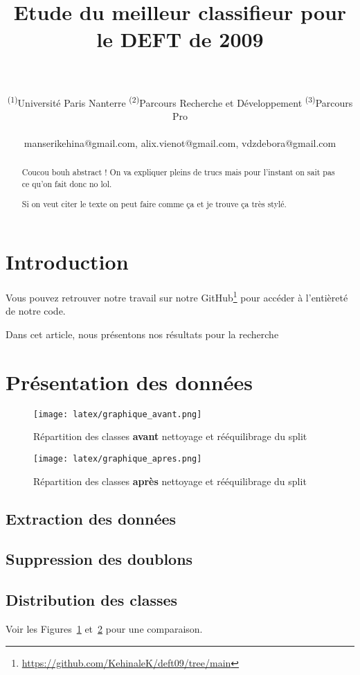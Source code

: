 \documentclass[11pt]{article}
\title{Etude du meilleur classifieur pour le DEFT de 2009}
\author{
  \text{MANSERI Kéhina\textsuperscript{(1)(2)}}
  \text{SIRVEN-VIENOT Alix\textsuperscript{(1)(2)}}
  \text{VAN-DEN-ZANDE Débora\textsuperscript{(1)(3)}}
\\
\\
  \textsuperscript{(1)}Université Paris Nanterre
  \textsuperscript{(2)}Parcours Recherche et Développement
  \textsuperscript{(3)}Parcours Pro
\\
\\
    \small {
    manserikehina@gmail.com, alix.vienot@gmail.com, vdzdebora@gmail.com
    }
\\
}
\begin{document}
\maketitle
\begin{abstract}
Coucou bouh abstract ! On va expliquer pleins de trucs mais pour l'instant on sait pas ce qu'on fait donc no lol.

Si on veut citer le texte on peut faire comme ça \cite{forest2009variation} et je trouve ça très stylé.

\end{abstract}

\section{Introduction}
Vous pouvez retrouver notre travail sur notre GitHub\footnote{\url{https://github.com/KehinaleK/deft09/tree/main}} pour accéder à l'entièreté de notre code.

Dans cet article, nous présentons nos résultats pour la recherche 

\section{Présentation des données}

\begin{figure}[h]
  \texttt{[image: latex/graphique\_avant.png]}
  \caption{Répartition des classes \textbf{avant} nettoyage et rééquilibrage du split}
  \label{fig:graph_avant} %
\end{figure}

\begin{figure}[h]
  \texttt{[image: latex/graphique\_apres.png]}
  \caption{Répartition des classes \textbf{après} nettoyage et rééquilibrage du split}
  \label{fig:graph_apres} %
\end{figure}

\subsection{Extraction des données}

\subsection{Suppression des doublons}

\subsection{Distribution des classes}
Voir les Figures~\ref{fig:graph_avant} et~\ref{fig:graph_apres} pour une comparaison.
\end{document}
